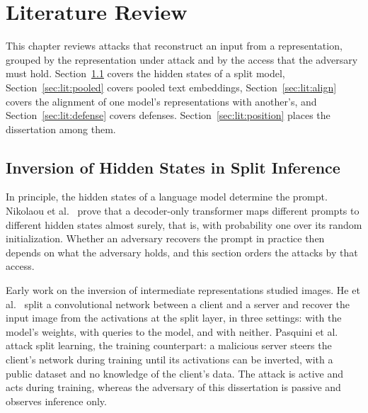 \providecommand{\vf}[1]{\textcolor{blue}{#1}}
\chapter{Literature Review}\label{ch:lit}

This chapter reviews attacks that reconstruct an input from a representation, grouped by the representation under attack and by the access that the adversary must hold.
Section~\ref{sec:lit:split} covers the hidden states of a split model, Section~\ref{sec:lit:pooled} covers pooled text embeddings, Section~\ref{sec:lit:align} covers the alignment of one model's representations with another's, and Section~\ref{sec:lit:defense} covers defenses.
Section~\ref{sec:lit:position} places the dissertation among them.

\section{Inversion of Hidden States in Split Inference}\label{sec:lit:split}

In principle, the hidden states of a language model determine the prompt.
Nikolaou et al.~\cite{nikolaou2026language} prove that a decoder-only transformer maps different prompts to different hidden states almost surely, that is, with probability one over its random initialization.
Whether an adversary recovers the prompt in practice then depends on what the adversary holds, and this section orders the attacks by that access.

Early work on the inversion of intermediate representations studied images.
He et al.~\cite{he2019model} split a convolutional network between a client and a server and recover the input image from the activations at the split layer, in three settings: with the model's weights, with queries to the model, and with neither.
Pasquini et al.~\cite{pasquini2021unleashing} attack split learning, the training counterpart: a malicious server steers the client's network during training until its activations can be inverted, with a public dataset and no knowledge of the client's data.
The attack is active and acts during training, whereas the adversary of this dissertation is passive and observes inference only.

